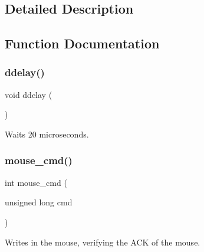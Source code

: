 \subsection{Detailed Description}


\subsection{Function Documentation}
\mbox{\label{group___mouse_ga4fb4a7f0f7a9ea26af0c1184b53f4bf3}} 
\subsubsection{\texorpdfstring{ddelay()}{ddelay()}}
{\footnotesize\ttfamily void ddelay (\begin{DoxyParamCaption}{ }\end{DoxyParamCaption})}



Waits 20 microseconds. 

\mbox{\label{group___mouse_gad7c890a972e1f92e3a494d356795a103}} 
\subsubsection{\texorpdfstring{mouse\+\_\+cmd()}{mouse\_cmd()}}
{\footnotesize\ttfamily int mouse\+\_\+cmd (\begin{DoxyParamCaption}\item[{unsigned long}]{cmd }\end{DoxyParamCaption})}



Writes in the mouse, verifying the A\+CK of the mouse. 



